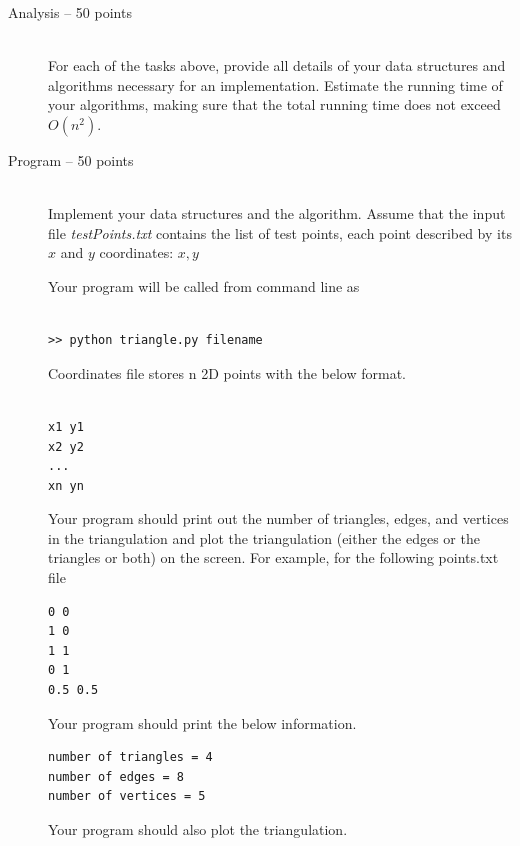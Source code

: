 \documentclass[11pt]{article}
\begin{document}
\begin{description}
\item [Analysis -- 50 points]\hfil\\ For each of the tasks above,
provide all details of your data structures and algorithms
necessary for an implementation.
Estimate the running time of your algorithms, making sure that the
total running time does not exceed $O(n^2)$.


\item[Program -- 50 points] \hfil\\ Implement your data structures
and the algorithm. Assume that  the input file  
{\em testPoints.txt}  contains the list  of test points, each point described by its $x$ and $y$ coordinates:
 $x, y$


Your program will be called from command line as

\begin{lstlisting}

>> python triangle.py filename

\end{lstlisting}

Coordinates file stores n 2D points with the below format.

\begin{lstlisting}

x1 y1
x2 y2
...
xn yn

\end{lstlisting}

Your program should print out the number of triangles, edges, and vertices in the triangulation 
and plot the triangulation (either the edges or the triangles or both) on the screen.
For example, for the following points.txt file

\begin{lstlisting}
0 0
1 0
1 1
0 1
0.5 0.5
\end{lstlisting}

Your program should print the below information.
\begin{lstlisting}
number of triangles = 4
number of edges = 8
number of vertices = 5
\end{lstlisting}
Your program should also plot the triangulation.



\end{description}
\end{document}
